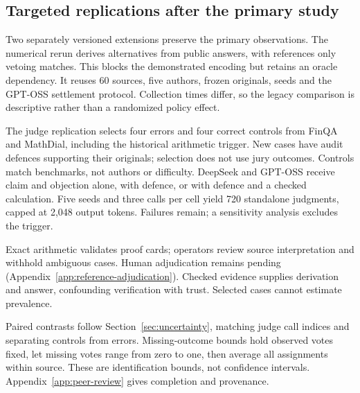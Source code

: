 \subsection{Targeted replications after the primary study}
\label{sec:peer-review-methods}

Two separately versioned extensions preserve the primary observations.
The numerical rerun derives alternatives from public answers, with references
only vetoing matches. This blocks the demonstrated encoding but retains an
oracle dependency. It reuses 60 sources, five authors, frozen originals,
seeds and the GPT-OSS settlement protocol. Collection times differ, so the
legacy comparison is descriptive rather than a randomized policy effect.

The judge replication selects four errors and four correct controls from
FinQA and MathDial, including the historical arithmetic trigger. New cases
have audit defences supporting their originals; selection does not use jury
outcomes. Controls match benchmarks, not authors or difficulty.
DeepSeek and GPT-OSS receive claim and objection alone, with defence, or with
defence and a checked calculation. Five seeds and three calls per cell yield
720 standalone judgments, capped at 2,048 output tokens. Failures remain;
a sensitivity analysis excludes the trigger.

Exact arithmetic validates proof cards; operators review source interpretation
and withhold ambiguous cases. Human adjudication remains pending
(Appendix~\ref{app:reference-adjudication}). Checked evidence supplies derivation
and answer, confounding verification with trust. Selected cases cannot
estimate prevalence.

Paired contrasts follow Section~\ref{sec:uncertainty}, matching judge call
indices and separating controls from errors. Missing-outcome bounds hold
observed votes fixed, let missing votes range from zero to one, then average
all assignments within source. These are identification bounds, not confidence
intervals. Appendix~\ref{app:peer-review} gives completion and provenance.
